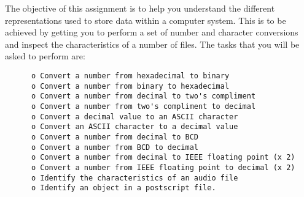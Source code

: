 \documentclass[a4paper,10pt]{article}
\begin{document}

The objective of this assignment is to help you understand the 
different representations used to store
data within a computer system. This is to be achieved by getting
you to perform a set of number and
character conversions and inspect the characteristics of a 
number of files.
The tasks that you will be asked to perform are:

\begin{comment}
\begin{enumerate}
\item Convert a number from hexadecimal to binary
\item Convert a number from binary to hexadecimal
\item Convert a number from decimal to two's compliment
\item Convert a number from two's compliment to decimal
\item Convert a decimal value to an ASCII character
\item Convert an ASCII character to a decimal value
\item Convert a number from decimal to BCD
\item Convert a number from BCD to decimal
\item Convert a number from decimal to IEEE floating point (x 2)
\item  Convert a number from IEEE floating point to decimal (x 2)
\item  Identify the characteristics of an audio file
\item  Identify an object in a postscript file.
\end{enumerate}
\end{comment}

\begin{verbatim}
      o Convert a number from hexadecimal to binary
      o Convert a number from binary to hexadecimal
      o Convert a number from decimal to two's compliment
      o Convert a number from two's compliment to decimal
      o Convert a decimal value to an ASCII character
      o Convert an ASCII character to a decimal value
      o Convert a number from decimal to BCD
      o Convert a number from BCD to decimal
      o Convert a number from decimal to IEEE floating point (x 2)
      o Convert a number from IEEE floating point to decimal (x 2)
      o Identify the characteristics of an audio file
      o Identify an object in a postscript file.
\end{verbatim}
\end{document}
